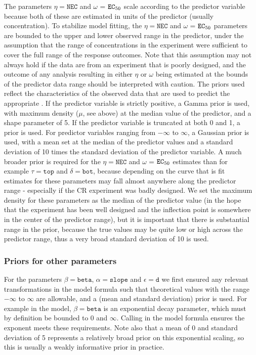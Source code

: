 \documentclass[
  shortnames]{jss}
\begin{document}
The parameters \(\eta = \mathtt{NEC}\) and \(\omega\) = \(\mathtt{EC\textsubscript{50}}\) scale according to the predictor variable because both of these are estimated in units of the predictor (usually concentration). To stabilize model fitting, the \(\eta = \mathtt{NEC}\) and \(\omega\) = \(\mathtt{EC\textsubscript{50}}\) parameters are bounded to the upper and lower observed range in the predictor, under the assumption that the range of concentrations in the experiment were sufficient to cover the full range of the response outcomes. Note that this assumption may not always hold if the data are from an experiment that is poorly designed, and the outcome of any analysis resulting in either \(\eta\) or \(\omega\) being estimated at the bounds of the predictor data range should be interpreted with caution. The priors used reflect the characteristics of the observed data that are used to predict the appropriate . If the predictor variable is strictly positive, a Gamma prior is used, with maximum density (\(\mu\), see above) at the median value of the predictor, and a shape parameter of 5. If the predictor variable is truncated at both 0 and 1, a  prior is used. For predictor variables ranging from \(-\infty\) to \(\infty\), a Gaussian prior is used, with a mean set at the median of the predictor values and a standard deviation of 10 times the standard deviation of the predictor variable. A much broader prior is required for the \(\eta = \mathtt{NEC}\) and \(\omega\) = \(\mathtt{EC\textsubscript{50}}\) estimates than for example \(\tau = \mathtt{top}\) and \(\delta = \mathtt{bot}\), because depending on the curve that is fit estimates for these parameters may fall almost anywhere along the predictor range - especially if the CR experiment was badly designed. We set the maximum density for these parameters as the median of the predictor value (in the hope that the experiment has been well designed and the inflection point is somewhere in the center of the predictor range), but it is important that there is substantial range in the prior, because the true values may be quite low or high across the predictor range, thus a very broad standard deviation of 10 is used.

\hypertarget{priors-for-other-parameters}{%
\subsubsection{Priors for other parameters}\label{priors-for-other-parameters}}

For the parameters \(\beta = \mathtt{beta}\), \(\alpha = \mathtt{slope}\) and \(\epsilon = \mathtt{d}\) we first ensured any relevant transformations in the model formula such that theoretical values with the range \(-\infty\) to \(\infty\) are allowable, and a  (mean and standard deviation) prior is used. For example in the  model, \(\beta = \mathtt{beta}\) is an exponential decay parameter, which must by definition be bounded to 0 and \(\infty\). Calling  in the model formula ensures the exponent meets these requirements. Note also that a mean of 0 and standard deviation of 5 represents a relatively broad prior on this exponential scaling, so this is usually a weakly informative prior in practice.
\end{document}
